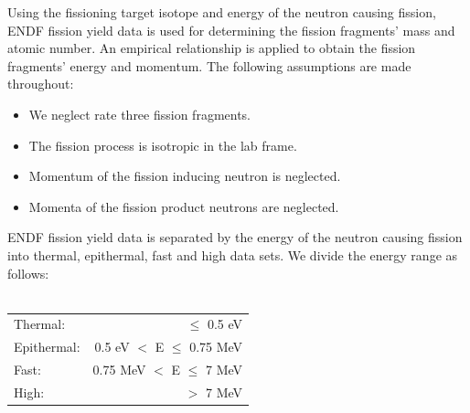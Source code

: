 \documentclass{anstrans}
\begin{document}
Using the fissioning target isotope and energy of the neutron causing fission, ENDF fission yield data \cite{ENDFManual} is used for determining the fission fragments' mass and atomic number. An empirical relationship is applied to obtain the fission fragments' energy and momentum. 
The following assumptions are made throughout:
\begin{itemize}
  \item We neglect rate three fission fragments.
  \item The fission process is isotropic in the lab frame.
  \item Momentum of the fission inducing neutron is neglected.
  \item Momenta of the fission product neutrons are neglected.
\end{itemize}

ENDF fission yield data is separated by the energy of the neutron causing fission into thermal, epithermal, fast and high data sets. We divide the energy range as follows:\\\\
\begin{tabular}{  l  r }
  Thermal:    & $\le$ 0.5 eV \\
  Epithermal: & 0.5 eV $<$ E $\le$ 0.75 MeV \\
  Fast:       & 0.75 MeV $<$ E $\le$ 7 MeV \\
  High:       & $>$ 7 MeV \\
\end{tabular}\\\\
\end{document}
